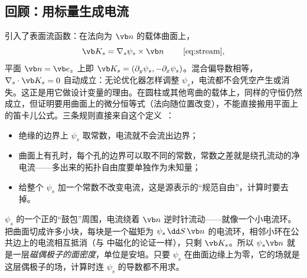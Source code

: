 \subsection{回顾：用标量生成电流}
 引入了表面流函数：在法向为 $\vb n$ 的载体曲面上，
\begin{equation*}
\vb K_s=\nabla_s\psi_s\times\vb n\qquad\text{ \eqref{eq:stream}},
\end{equation*}
平面 $\vb n=\vb e_z$ 上即 $\vb K_s=(\partial_y\psi_s,-\partial_x\psi_s)$。混合偏导数相等，$\nabla_s\cdot\vb K_s=0$ 自动成立：无论优化器怎样调整 $\psi_s$，电流都不会凭空产生或消失。这正是用它做设计变量的理由。在圆柱或其他弯曲的载体上，同样的守恒仍然成立，但证明要用曲面上的微分恒等式（法向随位置改变），不能直接搬用平面上的笛卡儿公式。三条规则直接来自这个定义~\cite{bfieldtheory}：
\begin{itemize}
\item 绝缘的边界上 $\psi_s$ 取常数，电流就不会流出边界；
\item 曲面上有孔时，每个孔的边界可以取不同的常数，常数之差就是绕孔流动的净电流——多出来的拓扑自由度要单独作为未知量；
\item 给整个 $\psi_s$ 加一个常数不改变电流，这是源表示的“规范自由”，计算时要去掉。
\end{itemize}

\begin{intuition}[流函数就是一层磁偶极子]
$\psi_s$ 的一个正的“鼓包”周围，电流绕着 $\vb n$ 逆时针流动——就像一个小电流环。把曲面切成许多小块，每块是一个磁矩为 $\psi_s\,\dd S\,\vb n$ 的电流环，相邻小环在公共边上的电流相互抵消（与 中磁化的论证一样），只剩 $\vb K_s$。所以 $\psi_s\vb n$ 就是一层\emph{磁偶极子的面密度}，单位是安培。只要 $\psi_s$ 在曲面边缘上为零，它的场就是这层偶极子的场，计算时连 $\psi_s$ 的导数都不用求。
\end{intuition}


